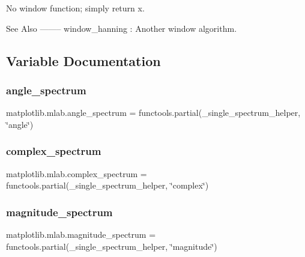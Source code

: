 \begin{DoxyVerb}No window function; simply return x.

See Also
--------
window_hanning : Another window algorithm.
\end{DoxyVerb}
 

\subsection{Variable Documentation}
\mbox{\label{namespacematplotlib_1_1mlab_a4c68c82f633551591f79ca822c4cba6f}} 
\subsubsection{\texorpdfstring{angle\+\_\+spectrum}{angle\_spectrum}}
{\footnotesize\ttfamily matplotlib.\+mlab.\+angle\+\_\+spectrum = functools.\+partial(\+\_\+single\+\_\+spectrum\+\_\+helper, \char`\"{}angle\char`\"{})}

\mbox{\label{namespacematplotlib_1_1mlab_af9fe23cd7c677efdfda27673cf1acd7b}} 
\subsubsection{\texorpdfstring{complex\+\_\+spectrum}{complex\_spectrum}}
{\footnotesize\ttfamily matplotlib.\+mlab.\+complex\+\_\+spectrum = functools.\+partial(\+\_\+single\+\_\+spectrum\+\_\+helper, \char`\"{}complex\char`\"{})}

\mbox{\label{namespacematplotlib_1_1mlab_a0900364120ca4896abeb582fafa87750}} 
\subsubsection{\texorpdfstring{magnitude\+\_\+spectrum}{magnitude\_spectrum}}
{\footnotesize\ttfamily matplotlib.\+mlab.\+magnitude\+\_\+spectrum = functools.\+partial(\+\_\+single\+\_\+spectrum\+\_\+helper, \char`\"{}magnitude\char`\"{})}

